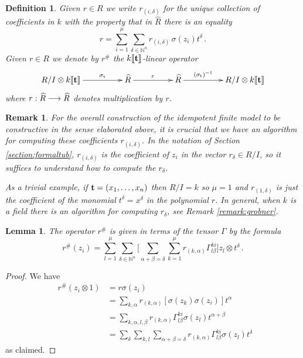 \documentclass[english,letter paper,12pt,leqno]{article}
\newtheorem{lemma}[theorem]{Lemma}
\theoremstyle{example}
\newtheorem{definition}[theorem]{Definition}
\newtheorem{remark}[theorem]{Remark}
\numberwithin{equation}{section}
\def\be{\begin{equation}}
\def\ee{\end{equation}}
\DeclareMathOperator{\sigmastar}{\sigma_t}
\begin{document}
\begin{definition}\label{defn:rsharp} Given $r \in R$ we write $r_{(i,\delta)}$ for the unique collection of coefficients in $k$ with the property that in $\widehat{R}$ there is an equality
\[
r = \sum_{i = 1}^\mu \sum_{\delta \in \mathbb{N}^n} r_{(i,\delta)} \,\sigma(z_i) t^{\delta}\,.
\]
Given $r \in R$ we denote by $r^{\#}$ the $k\llbracket \bold{t} \rrbracket$-linear operator
\[
\xymatrix@C+2pc{
R/I \otimes k\llbracket \bold{t} \rrbracket \ar[r]^-{\sigmastar} & \widehat{R} \ar[r]^{r} & \widehat{R} \ar[r]^-{(\sigmastar)^{-1}} & R/I \otimes k\llbracket \bold{t} \rrbracket
}
\]
where $r: \widehat{R} \longrightarrow \widehat{R}$ denotes multiplication by $r$.
\end{definition}

\begin{remark}\label{remark:compute_rdelta} For the overall construction of the idempotent finite model to be \emph{constructive} in the sense elaborated above, it is crucial that we have an algorithm for computing these coefficients $r_{(i, \delta)}$. In the notation of Section \ref{section:formaltub}, $r_{(i, \delta)}$ is the coefficient of $z_i$ in the vector $r_\delta \in R/I$, so it suffices to understand how to compute the $r_\delta$.

As a trivial example, if $\bold{t} = (x_1,\ldots,x_n)$ then $R/I = k$ so $\mu = 1$ and $r_{(1,\delta)}$ is just the coefficient of the monomial $t^{\delta} = x^{\delta}$ in the polynomial $r$. In general, when $k$ is a field there is an algorithm for computing $r_\delta$, see Remark \ref{remark:grobner}.
\end{remark}

\begin{lemma}\label{lemma:rsharp_explicit} The operator $r^{\#}$ is given in terms of the tensor $\Gamma$ by the formula
\be
r^{\#}(z_i) = \sum_{l=1}^\mu \sum_{\delta \in \mathbb{N}^n} \Big[ \sum_{\alpha + \beta = \delta } \sum_{k=1}^\mu r_{(k,\alpha)} \Gamma^{ki}_{l\beta} \Big] z_l \otimes t^\delta\,.
\ee
\end{lemma}
\begin{proof}
We have
\begin{align*}
\sigmastar r^{\#}(z_i \otimes 1) &= r \sigma(z_i)\\
&= \sum_{k, \alpha} r_{(k,\alpha)} [ \sigma(z_k) \sigma(z_i) ] t^{\alpha}\\
&= \sum_{k,\alpha,l,\beta} r_{(k,\alpha)} \Gamma^{ki}_{l \beta} \sigma(z_l) t^{\alpha + \beta}\\
&= \sum_\delta \sum_{k,l} \sum_{\alpha + \beta = \delta} r_{(k,\alpha)} \Gamma^{ki}_{l \beta} \sigma(z_l)t^\delta
\end{align*}
as claimed.
\end{proof}
\end{document}
